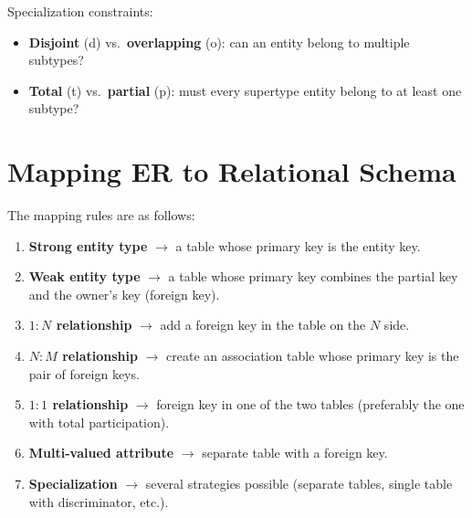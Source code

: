 Specialization constraints:
\begin{itemize}
    \item \textbf{Disjoint} (d) vs.\ \textbf{overlapping} (o): can an entity
          belong to multiple subtypes?
    \item \textbf{Total} (t) vs.\ \textbf{partial} (p): must every supertype
          entity belong to at least one subtype?
\end{itemize}

\section{Mapping ER to Relational Schema}

\begin{theorem}
The mapping rules are as follows:
\begin{enumerate}
    \item \textbf{Strong entity type} $\to$ a table whose primary key is the entity key.
    \item \textbf{Weak entity type} $\to$ a table whose primary key combines the
          partial key and the owner's key (foreign key).
    \item \textbf{$1:N$ relationship} $\to$ add a foreign key in the table on the $N$ side.
    \item \textbf{$N:M$ relationship} $\to$ create an association table whose primary key
          is the pair of foreign keys.
    \item \textbf{$1:1$ relationship} $\to$ foreign key in one of the two tables
          (preferably the one with total participation).
    \item \textbf{Multi-valued attribute} $\to$ separate table with a foreign key.
    \item \textbf{Specialization} $\to$ several strategies possible
          (separate tables, single table with discriminator, etc.).
\end{enumerate}
\end{theorem}

